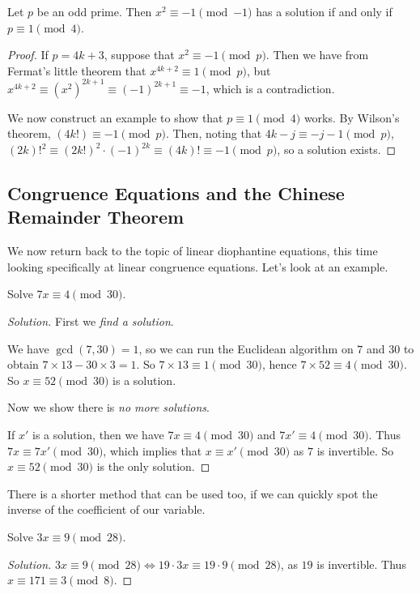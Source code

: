 \documentclass[a4paper]{scrreprt}
\begin{document}
\begin{lemma}[$x^2 + 1$ Lemma]
	Let $p$ be an odd prime. Then $x^2 \equiv -1 \pmod{-1}$ has a solution if and only if $p \equiv 1 \pmod{4}$.
\end{lemma}
\begin{proof}
	If $p = 4k + 3$, suppose that $x^2 \equiv -1 \pmod{p}$. Then we have from Fermat's little theorem that $x^{4k + 2} \equiv 1 \pmod{p}$, but $x^{4k + 2} \equiv (x^2)^{2k + 1} \equiv (-1)^{2k + 1} \equiv -1$, which is a contradiction.

	We now construct an example to show that $p \equiv 1 \pmod{4}$ works. By Wilson's theorem, $(4k!) \equiv -1 \pmod{p}$. Then, noting that $4k - j \equiv -j - 1 \pmod{p}$, $(2k)!^2 \equiv (2k!)^2 \cdot (-1)^{2k} \equiv (4k)! \equiv -1 \pmod{p}$, so a solution exists.
\end{proof}

\subsection{Congruence Equations and the Chinese Remainder Theorem}

We now return back to the topic of linear diophantine equations, this time looking specifically at linear congruence equations. Let's look at an example. 

\begin{example}
	Solve $7x \equiv 4 \pmod{30}$.
\end{example}
\begin{proof}[Solution]
	First we \emph{find a solution}.

	We have $\gcd(7, 30) = 1$, so we can run the Euclidean algorithm on $7$ and $30$ to obtain $7 \times 13 - 30 \times 3 = 1$. So $7 \times 13 \equiv 1 \pmod{30}$, hence $7 \times 52 \equiv 4 \pmod{30}$. So $x \equiv 52 \pmod{30}$ is a solution.

	Now we show there is \emph{no more solutions}.

	If $x'$ is a solution, then we have $7x \equiv 4 \pmod{30}$ and $7x' \equiv 4 \pmod{30}$. Thus $7x \equiv 7x' \pmod{30}$, which implies that $x \equiv x' \pmod{30}$ as $7$ is invertible.
	So $x \equiv 52 \pmod{30}$ is the only solution.
\end{proof}

There is a shorter method that can be used too, if we can quickly spot the inverse of the coefficient of our variable.

\begin{example}
	Solve $3x \equiv 9 \pmod{28}$.
\end{example}
\begin{proof}[Solution]
	$3x \equiv 9 \pmod{28} \iff 19 \cdot 3 x \equiv 19 \cdot 9 \pmod{28}$, as $19$ is invertible. Thus $x \equiv 171 \equiv 3 \pmod{8}$.
\end{proof}
\end{document}
